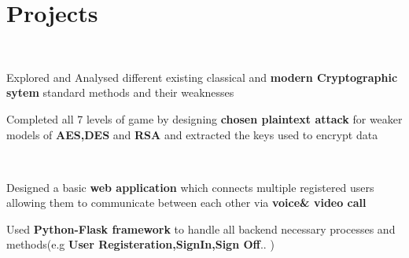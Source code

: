 \documentclass[]{deedy-resume-openfont}
\begin{document}
\begin{minipage}[t]{0.66\textwidth}
\section{Projects}
\\
\begin{tightemize}
	\item Explored and Analysed different existing classical and \textbf{modern Cryptographic sytem} standard methods and their weaknesses
	\item Completed all 7 levels of game by designing \textbf{chosen plaintext attack} for weaker models of \textbf{AES,DES} and \textbf{RSA} and extracted the keys used to encrypt data
\end{tightemize}
\\
\begin{tightemize}
	\item Designed a basic \textbf{web application} which connects multiple registered users allowing them to communicate between each other via \textbf{voice\& video call}
	\item Used \textbf{Python-Flask framework} to handle all backend necessary processes and methods(e.g\textbf{ User Registeration,SignIn,Sign Off}.. )

\end{tightemize}
\end{minipage}
\end{document}
